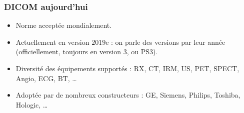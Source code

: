 	\frame
	{
		\frametitle{DICOM aujourd'hui}
		\begin{itemize}
			\item Norme accept\'ee mondialement.
			\item Actuellement en version $2019$e : on parle des versions par leur ann\'ee (officiellement, toujours en version 3, ou PS3).
			\item Diversit\'e des \'equipements support\'es : RX, CT, IRM, US, PET, SPECT, Angio, ECG, BT, \ldots
			\item Adopt\'ee par de nombreux constructeurs : GE, Siemens, Philips, Toshiba, Hologic, \ldots
		\end{itemize}
	}
